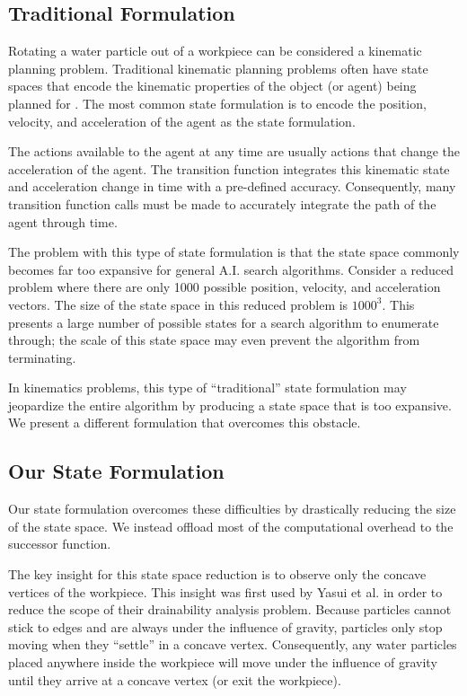 	\subsection{Traditional Formulation}

Rotating a water particle out of a workpiece can be considered a kinematic planning problem. Traditional kinematic planning problems often have state spaces that encode the kinematic properties of the object (or agent) being planned for \cite{PlanningBook} \cite{KinematicsBook}. The most common state formulation is to encode the position, velocity, and acceleration of the agent as the state formulation.

The actions available to the agent at any time are usually actions that change the acceleration of the agent. The transition function integrates this kinematic state and acceleration change in time with a pre-defined accuracy. Consequently, many transition function calls must be made to accurately integrate the path of the agent through time.

The problem with this type of state formulation is that the state space commonly becomes far too expansive for general A.I. search algorithms. Consider a reduced problem where there are only 1000 possible position, velocity, and acceleration vectors. The size of the state space in this reduced problem is $1000^3$. This presents a large number of possible states for a search algorithm to enumerate through; the scale of this state space may even prevent the algorithm from terminating.

In kinematics problems, this type of ``traditional'' state formulation may jeopardize the entire algorithm by producing a state space that is too expansive. We present a different formulation that overcomes this obstacle.

	\subsection{Our State Formulation}

Our state formulation overcomes these difficulties by drastically reducing the size of the state space. We instead offload most of the computational overhead to the successor function.

The key insight for this state space reduction is to observe only the concave vertices of the workpiece. This insight was first used by Yasui et al. \cite{Yasui2011} in order to reduce the scope of their drainability analysis problem. Because particles cannot stick to edges and are always under the influence of gravity, particles only stop moving when they ``settle'' in a concave vertex. Consequently, any water particles placed anywhere inside the workpiece will move under the influence of gravity until they arrive at a concave vertex (or exit the workpiece).

